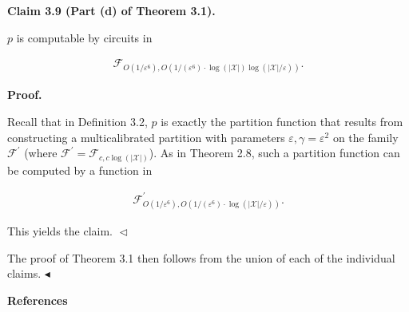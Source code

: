 \documentclass[10pt,a4paper]{article}
\begin{document}


\par\medskip\noindent\textbf{
Claim 3.9 (Part (d) of Theorem 3.1). 
}\par



$p$ is computable by circuits in\par


\[\begin{gathered}
\mathcal{F}_{O(1/\varepsilon^{6}),O(1/(\varepsilon^{6})\cdot\log(|\mathcal{X}|)\log(|\mathcal{X}|/\varepsilon))}.
\end{gathered}\]







\par\medskip\noindent\textbf{
\textbf{Proof}.}\par




Recall that in Definition 3.2, $p$ is exactly the partition function that results from constructing a multicalibrated partition with parameters $\varepsilon,\gamma=\varepsilon^{2}$ on the family $\mathcal{F}^{\prime}$ (where $\mathcal{F}^{\prime}=\mathcal{F}_{c,c\log(|\mathcal{X}|)}$). As in Theorem 2.8, such a partition function can be computed by a function in\par


\[\begin{gathered}
\mathcal{F}^{\prime}_{O(1/\varepsilon^{6}),O(1/(\varepsilon^{6})\cdot\log(|\mathcal{X}|/\varepsilon))}.
\end{gathered}\]


This yields the claim.
$\vartriangleleft$\par




The proof of Theorem 3.1 then follows from the union of each of the individual claims.
$\blacktriangleleft$\par







\par\medskip\noindent\textbf{References}\par
\end{document}

